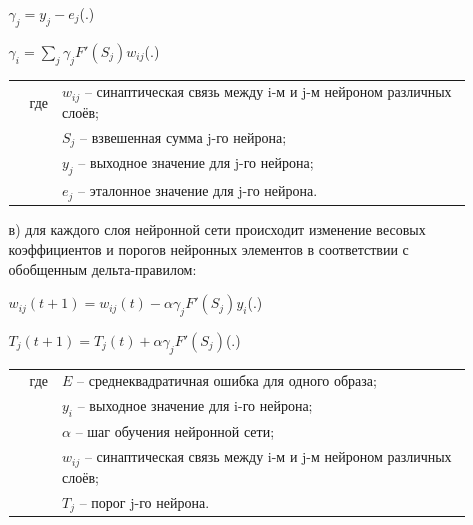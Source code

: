 \begin{itemize}[leftmargin=2.15cm, labelwidth=0.65cm, labelsep=0.0cm]
\begin{itemize}[leftmargin=1.5cm, labelwidth=0.65cm, labelsep=0.0cm]
			\formulaspace \par \redline 
			$\gamma_{j} = y_{j} - e_{j} $\hfill (\thechaptercntr .\theformulacntr) \redline
			\formulaspace \addtocounter{formulacntr}{1}
			
			\formulaspace \par \redline 
			$\gamma_{i} =  \sum \limits _{j}^{} \gamma_{j} F'(S_{j}) w_{ij}$\hfill (\thechaptercntr .\theformulacntr) \redline
			\formulaspace \addtocounter{formulacntr}{1}
			
			\begin{tabular}{p{}p{}p{}}
				& где  & $w_{ij}$ {--} синаптическая связь между i-м и j-м нейроном различных слоёв; \\
				&      & $S_{j}$ {--} взвешенная сумма j-го нейрона; \\
				&      & $y_{j}$ {--} выходное значение для j-го нейрона; \\
				&      & $e_{j}$ {--} эталонное значение для j-го нейрона. \\
			\end{tabular}
			
			\item[в)] для каждого слоя нейронной сети происходит изменение весовых коэффициентов и порогов нейронных элементов в соответствии с обобщенным дельта-правилом:
			
			\formulaspace \par \redline 
			$w_{ij}(t+1) = w_{ij}(t) - \alpha \gamma_{j} F'(S_{j}) y_{i} $\hfill (\thechaptercntr .\theformulacntr) \redline
			\formulaspace \addtocounter{formulacntr}{1}
			
			\formulaspace \par \redline 
			$T_{j}(t+1) = T_{j}(t) + \alpha \gamma_{j} F'(S_{j}) $\hfill (\thechaptercntr .\theformulacntr) \redline
			\formulaspace \addtocounter{formulacntr}{1}
			
			\begin{tabular}{p{}p{}p{}}
			& где  & $E$ {--} среднеквадратичная ошибка для одного образа; \\
			&      & $y_{i}$ {--} выходное значение для i-го нейрона; \\
			&      & $\alpha$ {--} шаг обучения нейронной сети; \\
			&      &  $w_{ij}$ {--} синаптическая связь между i-м и j-м нейроном различных слоёв; \\
			&      & $T_{j}$ {--} порог j-го нейрона. \\
			\end{tabular}
			

\end{itemize}
\end{itemize}
